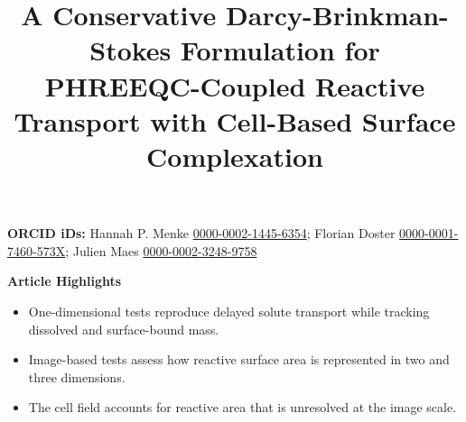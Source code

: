 \documentclass[pdflatex,sn-basic]{sn-jnl}
\begin{document}
\title[Conservative DBS Formulation for PHREEQC-Coupled Reactive Transport]{A Conservative Darcy-Brinkman-Stokes Formulation for PHREEQC-Coupled Reactive Transport with Cell-Based Surface Complexation}

\author*[1,2]{ }

\author[1,2]{ }

\author[1,2]{ }






\maketitle

\begingroup
\centering\fontsize{4.5}{5.5}\selectfont
\textbf{ORCID iDs:} Hannah P. Menke \href{https://orcid.org/0000-0002-1445-6354}{0000-0002-1445-6354};
Florian Doster \href{https://orcid.org/0000-0001-7460-573X}{0000-0001-7460-573X};
Julien Maes \href{https://orcid.org/0000-0002-3248-9758}{0000-0002-3248-9758}\par
\endgroup

\noindent\textbf{Article Highlights}
\begin{itemize}
\item One-dimensional tests reproduce delayed solute transport while tracking dissolved and surface-bound mass.
\item Image-based tests assess how reactive surface area is represented in two and three dimensions.
\item The cell field accounts for reactive area that is unresolved at the image scale.
\end{itemize}








\end{document}
